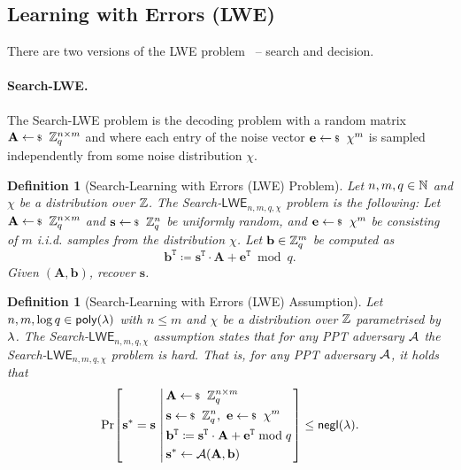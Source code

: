 \documentclass[10pt,twoside]{article}
\newtheorem{definition}[theorem]{Definition}
\renewcommand{\vec}[1]{\mathbf{#1}}
\newcommand{\mat}[1]{\mathbf{#1}}
\newcommand{\transpose}{\mathtt{T}}
\newcommand{\LWE}{\mathsf{LWE}}
\begin{document}
\subsection{Learning with Errors (LWE)}

There are two versions of the LWE problem~\cite{STOC:Regev05} -- search and decision.

\paragraph{Search-LWE.}

The Search-LWE problem is the decoding problem with a random matrix $\mat{A} \sample \ZZ_q^{n \times m}$ and where each entry of the noise vector $\vec{e} \sample \chi^m$ is sampled independently from some noise distribution $\chi$.

\begin{definition}[Search-Learning with Errors (LWE) Problem]
    Let $n,m,q \in \mathbb{N}$ and $\chi$ be a distribution over $\mathbb{Z}$.
    The Search-$\LWE_{n,m,q,\chi}$ problem is the following:
    Let $\mat{A} \sample \ZZ_q^{n \times m}$ and $\vec{s} \sample \ZZ_q^n$ be uniformly random, and $\vec{e} \sample \chi^m$ be consisting of $m$ i.i.d. samples from the distribution $\chi$.
    Let $\vec{b} \in \ZZ_q^m$ be computed as \[\vec{b}^\transpose \coloneqq \vec{s}^\transpose \cdot \mat{A} + \vec{e}^\transpose \bmod q.\]
    Given $(\mat{A}, \vec{b})$, recover $\vec{s}$.
\end{definition}

\begin{definition}[Search-Learning with Errors (LWE) Assumption]
    Let $n, m, \log q \in \poly$ with $n \leq m$ and $\chi$ be a distribution over $\mathbb{Z}$ parametrised by $\lambda$.
    The Search-$\LWE_{n,m,q,\chi}$ assumption states that for any PPT adversary $\mathcal{A}$ the Search-$\LWE_{n,m,q,\chi}$ problem is hard.
    That is, for any PPT adversary $\mathcal{A}$, it holds that
    \[
        \condprob{
            \vec{s}^* = \vec{s}
        }
        {
            \begin{aligned}
                &\mat{A} \sample \ZZ_q^{n \times m} \\
                &\vec{s} \sample \ZZ_q^n,~\vec{e} \sample \chi^m \\
                &\vec{b}^\transpose \coloneqq \vec{s}^\transpose \cdot \mat{A} + \vec{e}^\transpose \bmod q \\
                &\vec{s}^* \gets \adv(\mat{A},\vec{b}) \\
            \end{aligned}
        }
        \leq \negl.
    \]
\end{definition}
\end{document}
